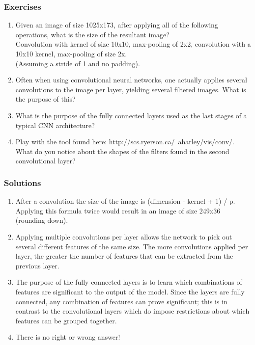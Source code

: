 \documentclass{article}
\begin{document}
\subsubsection{Exercises}

\begin{enumerate}
\item Given an image of size 1025x173, after applying all of the following operations, what is the size of the resultant image?\\
Convolution with kernel of size 10x10, max-pooling of 2x2, convolution with a 10x10 kernel, max-pooling of size 2x.\\
(Assuming a stride of 1 and no padding).

\item Often when using convolutional neural networks, one actually applies several convolutions to the image per layer, yielding several filtered images. What is the purpose of this?

\item What is the purpose of the fully connected layers used as the last stages of a typical CNN architecture?

\item Play with the tool found here: http://scs.ryerson.ca/~aharley/vis/conv/. What do you notice about the shapes of the filters found in the second convolutional layer?

\end{enumerate}

\subsubsection{Solutions}

\begin{enumerate}
\item After a convolution the size of the image is (dimension - kernel + 1) / p. 
Applying this formula twice would result in an image of size 249x36 (rounding down).

\item Applying multiple convolutions per layer allows the network to pick out several different features
of the same size. The more convolutions applied per layer, the greater the number of features that can be extracted from the previous layer.

\item The purpose of the fully connected layers is to learn which combinations of features are significant to the output of the model. Since the layers are fully connected, any combination of features can prove significant; this is in contrast to the convolutional layers which do impose restrictions about which features can be grouped together.

\item There is no right or wrong answer! 

\end{enumerate}
\end{document}
